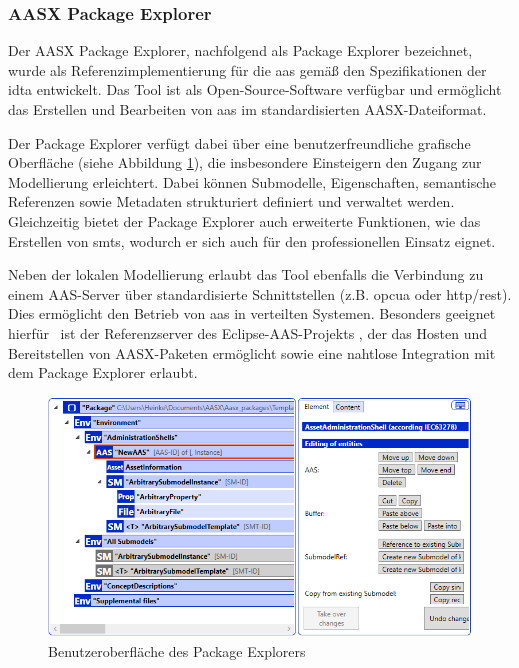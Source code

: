 \subsubsection{AASX Package Explorer}
Der AASX Package Explorer, nachfolgend als Package Explorer bezeichnet, wurde als Referenzimplementierung für die \acs{aas} gemäß den Spezifikationen der \acs{idta} entwickelt.
Das Tool ist als Open-Source-Software \cite{AASXPackageExplorer} verfügbar und ermöglicht das Erstellen und Bearbeiten von \acs{aas} im standardisierten AASX-Dateiformat.

Der Package Explorer verfügt dabei über eine benutzerfreundliche grafische Oberfläche (siehe Abbildung \ref{fig:AASXPackageExplorer}), die insbesondere Einsteigern den Zugang zur Modellierung erleichtert.
Dabei können Submodelle, Eigenschaften, semantische Referenzen sowie Metadaten strukturiert definiert und verwaltet werden.
Gleichzeitig bietet der Package Explorer auch erweiterte Funktionen, wie das Erstellen von \acsp{smt}, wodurch er sich auch für den professionellen Einsatz eignet.

Neben der lokalen Modellierung erlaubt das Tool ebenfalls die Verbindung zu einem AAS-Server über standardisierte Schnittstellen (z.B. \acs{opcua} oder \acs{http}/\acs{rest}).
Dies ermöglicht den Betrieb von \acs{aas} in verteilten Systemen.
Besonders geeignet hierfür%
\pagebreak
~ist der Referenzserver des Eclipse-AAS-Projekts \cite{AASXServer}, der das Hosten und Bereitstellen von AASX-Paketen ermöglicht sowie eine nahtlose Integration mit dem Package Explorer erlaubt.

\begin{figure}[htbp]
    \centering
    \includegraphics[scale=0.765]{Bilder/ModellierungAAS/Final/Grundlagen_PE.PNG}
    \caption[Benutzeroberfläche des Package Explorers]{Benutzeroberfläche des Package Explorers} 
    \label{fig:AASXPackageExplorer}
\end{figure}

